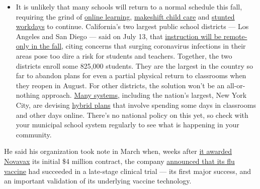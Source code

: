 \begin{itemize}
  \begin{itemize}
  \tightlist
  \item
    It is unlikely that many schools will return to a normal schedule
    this fall, requiring the grind of
    \href{https://www.nytimes.com/2020/06/05/us/coronavirus-education-lost-learning.html?action=click\&pgtype=Article\&state=default\&region=MAIN_CONTENT_3\&context=storylines_faq}{online
    learning},
    \href{https://www.nytimes.com/2020/05/29/us/coronavirus-child-care-centers.html?action=click\&pgtype=Article\&state=default\&region=MAIN_CONTENT_3\&context=storylines_faq}{makeshift
    child care} and
    \href{https://www.nytimes.com/2020/06/03/business/economy/coronavirus-working-women.html?action=click\&pgtype=Article\&state=default\&region=MAIN_CONTENT_3\&context=storylines_faq}{stunted
    workdays} to continue. California's two largest public school
    districts --- Los Angeles and San Diego --- said on July 13, that
    \href{https://www.nytimes.com/2020/07/13/us/lausd-san-diego-school-reopening.html?action=click\&pgtype=Article\&state=default\&region=MAIN_CONTENT_3\&context=storylines_faq}{instruction
    will be remote-only in the fall}, citing concerns that surging
    coronavirus infections in their areas pose too dire a risk for
    students and teachers. Together, the two districts enroll some
    825,000 students. They are the largest in the country so far to
    abandon plans for even a partial physical return to classrooms when
    they reopen in August. For other districts, the solution won't be an
    all-or-nothing approach.
    \href{https://bioethics.jhu.edu/research-and-outreach/projects/eschool-initiative/school-policy-tracker/}{Many
    systems}, including the nation's largest, New York City, are
    devising
    \href{https://www.nytimes.com/2020/06/26/us/coronavirus-schools-reopen-fall.html?action=click\&pgtype=Article\&state=default\&region=MAIN_CONTENT_3\&context=storylines_faq}{hybrid
    plans} that involve spending some days in classrooms and other days
    online. There's no national policy on this yet, so check with your
    municipal school system regularly to see what is happening in your
    community.
  \end{itemize}
\end{itemize}

He said his organization took note in March when, weeks after
\href{https://ir.novavax.com/news-releases/news-release-details/novavax-awarded-funding-cepi-covid-19-vaccine-development}{it
awarded Novavax} its initial \$4 million contract, the company
\href{https://ir.novavax.com/news-releases/news-release-details/novavax-nanoflu-achieves-all-primary-endpoints-phase-3-clinical}{announced
that its flu vaccine} had succeeded in a late-stage clinical trial ---
its first major success, and an important validation of its underlying
vaccine technology.

